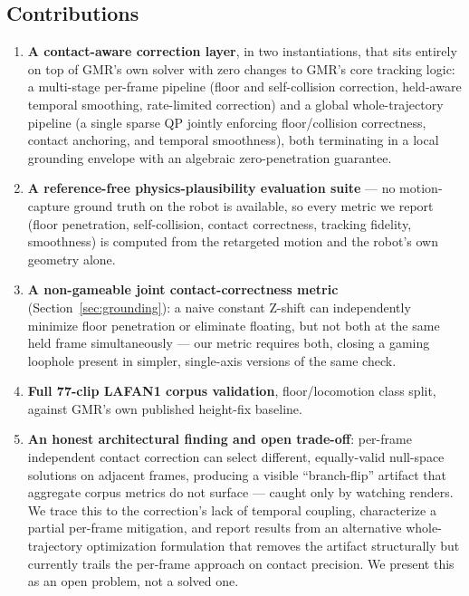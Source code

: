 \subsection{Contributions}
\label{sec:contributions}

\begin{enumerate}
  \item \textbf{A contact-aware correction layer}, in two instantiations,
    that sits entirely on top of GMR's own solver with zero changes to
    GMR's core tracking logic: a multi-stage per-frame pipeline (floor and
    self-collision correction, held-aware temporal smoothing, rate-limited
    correction) and a global whole-trajectory pipeline (a single sparse QP
    jointly enforcing floor/collision correctness, contact anchoring, and
    temporal smoothness), both terminating in a local grounding envelope
    with an algebraic zero-penetration guarantee.
  \item \textbf{A reference-free physics-plausibility evaluation suite} ---
    no motion-capture ground truth on the robot is available, so every
    metric we report (floor penetration, self-collision, contact
    correctness, tracking fidelity, smoothness) is computed from the
    retargeted motion and the robot's own geometry alone.
  \item \textbf{A non-gameable joint contact-correctness metric}
    (Section~\ref{sec:grounding}): a naive constant Z-shift can
    independently minimize floor penetration or eliminate floating, but not
    both at the same held frame simultaneously --- our metric requires
    both, closing a gaming loophole present in simpler, single-axis
    versions of the same check.
  \item \textbf{Full 77-clip LAFAN1 corpus validation}, floor/locomotion
    class split, against GMR's own published height-fix baseline.
  \item \textbf{An honest architectural finding and open trade-off}:
    per-frame independent contact correction can select different,
    equally-valid null-space solutions on adjacent frames, producing a
    visible ``branch-flip'' artifact that aggregate corpus metrics do not
    surface --- caught only by watching renders. We trace this to the
    correction's lack of temporal coupling, characterize a partial
    per-frame mitigation, and report results from an alternative
    whole-trajectory optimization formulation that removes the artifact
    structurally but currently trails the per-frame approach on contact
    precision. We present this as an open problem, not a solved one.
\end{enumerate}

